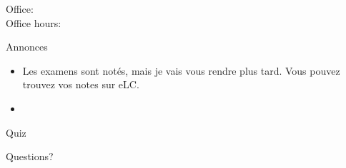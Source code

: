 \documentclass{beamer}
\subtitle[Études et professions]{Les études et les professions}
\begin{document}
  \begin{frame}
    \titlepage
    \tiny{Office: \\
          Office hours: }
  \end{frame}

  \begin{frame}{Annonces}
    \begin{itemize}
      \item Les examens sont notés, mais je vais vous rendre plus tard. Vous pouvez trouvez vos notes sur eLC.
      \item[] 
    \end{itemize}
  \end{frame}

  \begin{frame}{}

  \end{frame}

  \begin{frame}{}
    \begin{center}
      \Large Quiz
    \end{center}
  \end{frame}

  \begin{frame}{}

  \end{frame}

  \begin{frame}{}
    \begin{center}
      \Large Questions?
    \end{center}
  \end{frame}
\end{document}
